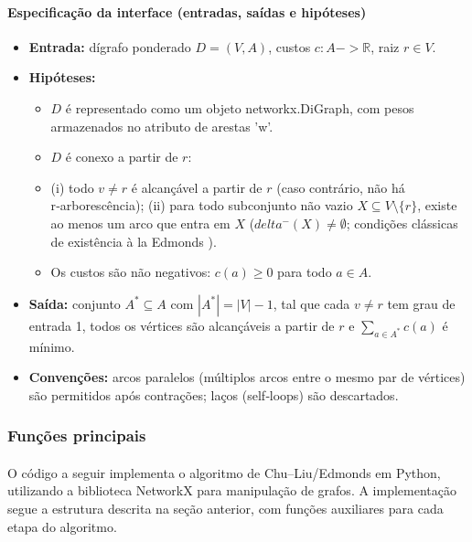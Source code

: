 \documentclass[12pt,a4paper]{article}
\def\texttt#1{#1}%
\def\to{->}%
\def\delta{delta}%
\begin{document}
\paragraph{Especificação da interface (entradas, saídas e hipóteses)}

\begin{itemize}\setlength{\itemsep}{2pt}
    \item \textbf{Entrada:} dígrafo ponderado \(D=(V,A)\), custos \(c:A\to\mathbb{R}\), raiz \(r\in V\).
    \item \textbf{Hipóteses:}
        \begin{itemize}\setlength{\itemsep}{2pt}
            \item \(D\) é representado como um objeto \texttt{networkx.DiGraph}, com pesos armazenados no atributo de arestas \texttt{'w'}.
            \item \(D\) é conexo a partir de \(r\):
            \item (i) todo \(v\neq r\) é alcançável a partir de \(r\) (caso contrário, não há r‑arborescência); (ii) para todo subconjunto não vazio \(X\subseteq V\setminus\{r\}\), existe ao menos um arco que entra em \(X\) (\(\delta^-(X)\neq\emptyset\); condições clássicas de existência \`a la Edmonds \cite{schrijver2003comb}).
            \item Os custos são não negativos: \(c(a)\ge 0\) para todo \(a\in A\).
        \end{itemize}
    \item \textbf{Saída:} conjunto \(A^*\subseteq A\) com \(|A^*|=|V|-1\), tal que cada \(v\neq r\) tem grau de entrada 1, todos os vértices são alcançáveis a partir de \(r\) e \(\sum_{a\in A^*} c(a)\) é mínimo.
    \item \textbf{Convenções:} arcos paralelos (múltiplos arcos entre o mesmo par de vértices) são permitidos após contrações; laços (self‑loops) são descartados.
\end{itemize}


\subsubsection{Funções principais}

\paragraph{}
O código a seguir implementa o algoritmo de Chu–Liu/Edmonds em Python, utilizando a biblioteca NetworkX para manipulação de grafos. A implementação segue a estrutura descrita na seção anterior, com funções auxiliares para cada etapa do algoritmo.
\end{document}
